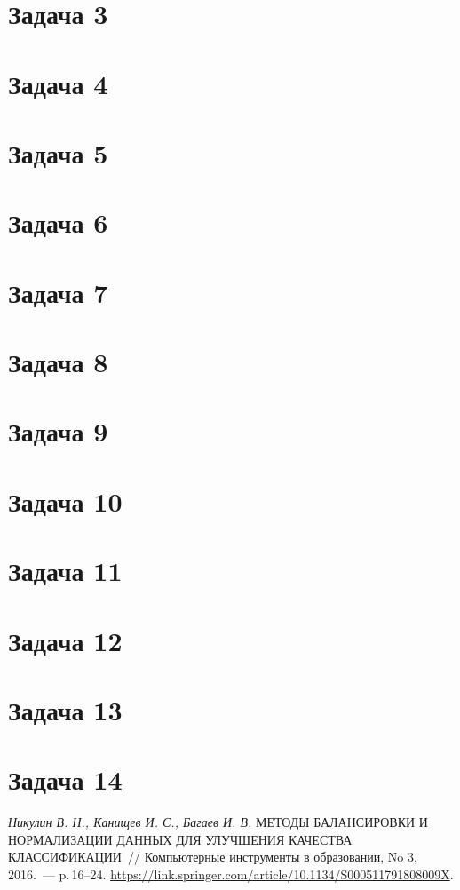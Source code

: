 \documentclass[12pt, twoside]{article}
\begin{document}
\section{Задача 3}
\section{Задача 4}
\section{Задача 5}
\section{Задача 6}
\section{Задача 7}
\section{Задача 8}
\section{Задача 9}
\section{Задача 10}
\section{Задача 11}
\section{Задача 12}
\section{Задача 13}
\section{Задача 14}

\begin{thebibliography}{1}
    \emph{Никулин В. Н., Канищев И. С., Багаев И. В.}
    МЕТОДЫ БАЛАНСИРОВКИ И НОРМАЛИЗАЦИИ ДАННЫХ ДЛЯ УЛУЧШЕНИЯ КАЧЕСТВА КЛАССИФИКАЦИИ~//
   Компьютерные инструменты в образовании, No 3, 2016.~--- p.\,16–24.
    \url{https://link.springer.com/article/10.1134/S000511791808009X}.
\end{thebibliography}
\end{document}

